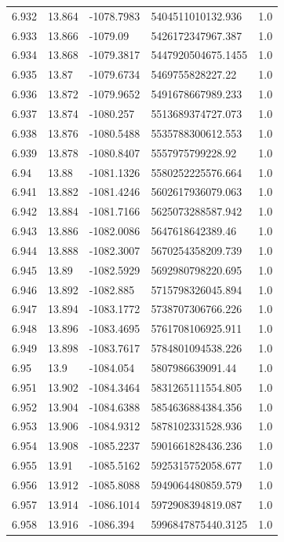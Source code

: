 \begin{tabular}{lllll}
6.932 & 13.864 & -1078.7983 & 5404511010132.936 & 1.0 \\
6.933 & 13.866 & -1079.09 & 5426172347967.387 & 1.0 \\
6.934 & 13.868 & -1079.3817 & 5447920504675.1455 & 1.0 \\
6.935 & 13.87 & -1079.6734 & 5469755828227.22 & 1.0 \\
6.936 & 13.872 & -1079.9652 & 5491678667989.233 & 1.0 \\
6.937 & 13.874 & -1080.257 & 5513689374727.073 & 1.0 \\
6.938 & 13.876 & -1080.5488 & 5535788300612.553 & 1.0 \\
6.939 & 13.878 & -1080.8407 & 5557975799228.92 & 1.0 \\
6.94 & 13.88 & -1081.1326 & 5580252225576.664 & 1.0 \\
6.941 & 13.882 & -1081.4246 & 5602617936079.063 & 1.0 \\
6.942 & 13.884 & -1081.7166 & 5625073288587.942 & 1.0 \\
6.943 & 13.886 & -1082.0086 & 5647618642389.46 & 1.0 \\
6.944 & 13.888 & -1082.3007 & 5670254358209.739 & 1.0 \\
6.945 & 13.89 & -1082.5929 & 5692980798220.695 & 1.0 \\
6.946 & 13.892 & -1082.885 & 5715798326045.894 & 1.0 \\
6.947 & 13.894 & -1083.1772 & 5738707306766.226 & 1.0 \\
6.948 & 13.896 & -1083.4695 & 5761708106925.911 & 1.0 \\
6.949 & 13.898 & -1083.7617 & 5784801094538.226 & 1.0 \\
6.95 & 13.9 & -1084.054 & 5807986639091.44 & 1.0 \\
6.951 & 13.902 & -1084.3464 & 5831265111554.805 & 1.0 \\
6.952 & 13.904 & -1084.6388 & 5854636884384.356 & 1.0 \\
6.953 & 13.906 & -1084.9312 & 5878102331528.936 & 1.0 \\
6.954 & 13.908 & -1085.2237 & 5901661828436.236 & 1.0 \\
6.955 & 13.91 & -1085.5162 & 5925315752058.677 & 1.0 \\
6.956 & 13.912 & -1085.8088 & 5949064480859.579 & 1.0 \\
6.957 & 13.914 & -1086.1014 & 5972908394819.087 & 1.0 \\
6.958 & 13.916 & -1086.394 & 5996847875440.3125 & 1.0 \\

\end{tabular}
